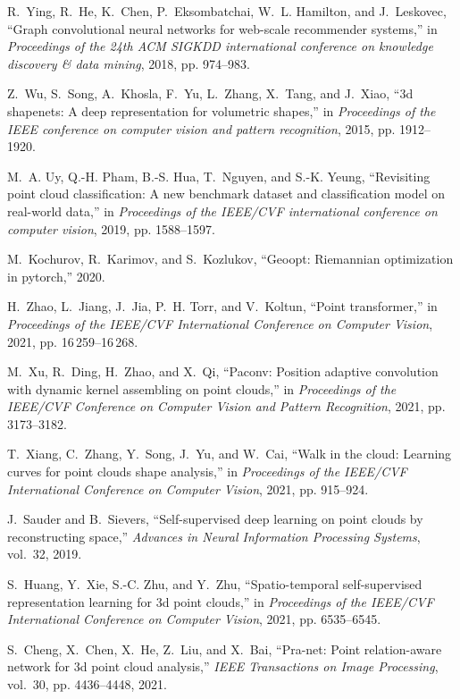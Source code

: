 \documentclass{article}
\begin{document}
\begin{thebibliography}{10}
R.~Ying, R.~He, K.~Chen, P.~Eksombatchai, W.~L. Hamilton, and J.~Leskovec,
  ``Graph convolutional neural networks for web-scale recommender systems,'' in
  \emph{Proceedings of the 24th ACM SIGKDD international conference on
  knowledge discovery \& data mining}, 2018, pp. 974--983.

Z.~Wu, S.~Song, A.~Khosla, F.~Yu, L.~Zhang, X.~Tang, and J.~Xiao, ``3d
  shapenets: A deep representation for volumetric shapes,'' in
  \emph{Proceedings of the IEEE conference on computer vision and pattern
  recognition}, 2015, pp. 1912--1920.

M.~A. Uy, Q.-H. Pham, B.-S. Hua, T.~Nguyen, and S.-K. Yeung, ``Revisiting point
  cloud classification: A new benchmark dataset and classification model on
  real-world data,'' in \emph{Proceedings of the IEEE/CVF international
  conference on computer vision}, 2019, pp. 1588--1597.

M.~Kochurov, R.~Karimov, and S.~Kozlukov, ``Geoopt: Riemannian optimization in
  pytorch,'' 2020.

H.~Zhao, L.~Jiang, J.~Jia, P.~H. Torr, and V.~Koltun, ``{Point transformer},''
  in \emph{Proceedings of the IEEE/CVF International Conference on Computer
  Vision}, 2021, pp. 16\,259--16\,268.

M.~Xu, R.~Ding, H.~Zhao, and X.~Qi, ``{Paconv: Position adaptive convolution
  with dynamic kernel assembling on point clouds},'' in \emph{Proceedings of
  the IEEE/CVF Conference on Computer Vision and Pattern Recognition}, 2021,
  pp. 3173--3182.

T.~Xiang, C.~Zhang, Y.~Song, J.~Yu, and W.~Cai, ``{Walk in the cloud: Learning
  curves for point clouds shape analysis},'' in \emph{Proceedings of the
  IEEE/CVF International Conference on Computer Vision}, 2021, pp. 915--924.

J.~Sauder and B.~Sievers, ``{Self-supervised deep learning on point clouds by
  reconstructing space},'' \emph{Advances in Neural Information Processing
  Systems}, vol.~32, 2019.

S.~Huang, Y.~Xie, S.-C. Zhu, and Y.~Zhu, ``Spatio-temporal self-supervised
  representation learning for 3d point clouds,'' in \emph{Proceedings of the
  IEEE/CVF International Conference on Computer Vision}, 2021, pp. 6535--6545.

S.~Cheng, X.~Chen, X.~He, Z.~Liu, and X.~Bai, ``{Pra-net: Point relation-aware
  network for 3d point cloud analysis},'' \emph{IEEE Transactions on Image
  Processing}, vol.~30, pp. 4436--4448, 2021.


\end{thebibliography}
\end{document}
